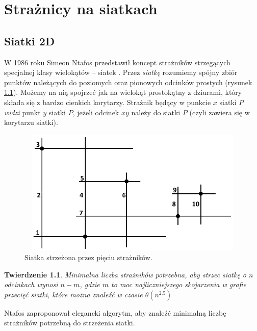 \documentclass[brudnopis]{xmgr}
\newtheorem{Twierdzenie}{Twierdzenie}
\theoremstyle{definition}
\begin{document}
\chapter{Strażnicy na siatkach}
\section{Siatki 2D} \label{sec:siatki}
W 1986 roku Simeon Ntafos przedstawił koncept strażników strzegących specjalnej klasy wielokątów -- siatek \cite{ntafos}.
Przez \emph{siatkę} rozumiemy spójny zbiór punktów należących do poziomych oraz pionowych odcinków prostych (rysunek \ref{fig:siatka 2d}). Możemy na nią spojrzeć jak na wielokąt prostokątny z dziurami, który składa się z bardzo cienkich korytarzy.
Strażnik będący w punkcie $x$ siatki $P$ \emph{widzi} punkt $y$ siatki $P$, jeżeli odcinek $xy$ należy do siatki $P$ (czyli zawiera się w korytarzu siatki).
 \begin{figure}[ht!]
   \centering
   \includegraphics[width=14cm,height=6cm]{rysunki/przykladowa_siatka.png}
   \caption{Siatka strzeżona przez pięciu strażników.}
   \label{fig:siatka 2d}
 \end{figure} 

\begin{Twierdzenie} \cite{ntafos}
	Minimalna liczba strażników potrzebna, aby strzec siatkę o $n$ odcinkach wynosi $n - m$, gdzie $m$ to moc najliczniejszego skojarzenia w grafie przecięć siatki, które można znaleźć w czasie $\theta(n^{2.5})$
\end{Twierdzenie}

Ntafos zaproponował elegancki algorytm, aby znaleźć minimalną liczbę strażników potrzebną do strzeżenia siatki.
\end{document}
